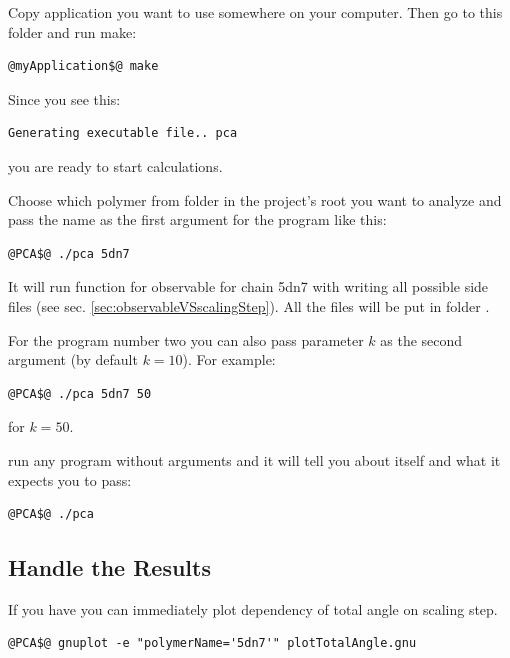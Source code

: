 \documentclass[12pt]{article}
\begin{document}
\begin{mySection}
Copy application you want to use somewhere on your computer. Then go to this folder and run make:
\begin{lstlisting}
@myApplication$@ make
\end{lstlisting}
Since you see this:
\begin{lstlisting}
Generating executable file.. pca
\end{lstlisting}
you are ready to start calculations.

Choose which polymer from folder  in the project's root you want to analyze and pass the name as the first argument for the program like this:
\begin{lstlisting}
@PCA$@ ./pca 5dn7
\end{lstlisting}
It will run function  for observable  for chain 5dn7 with writing all possible side files (see sec. \ref{sec:observableVSscalingStep}). All the files will be put in folder .

For the program number two you can also pass parameter $k$ as the second argument (by default $k=10$). For example:
\begin{lstlisting}
@PCA$@ ./pca 5dn7 50
\end{lstlisting}
for $k=50$.

\hint run any program without arguments and it will tell you about itself and what it expects you to pass:
\begin{lstlisting}
@PCA$@ ./pca
\end{lstlisting}

\subsection{Handle the Results}
If you have  you can immediately plot dependency of total angle on scaling step.
\begin{lstlisting}
@PCA$@ gnuplot -e "polymerName='5dn7'" plotTotalAngle.gnu 
\end{lstlisting}

\end{mySection}


\end{document}

